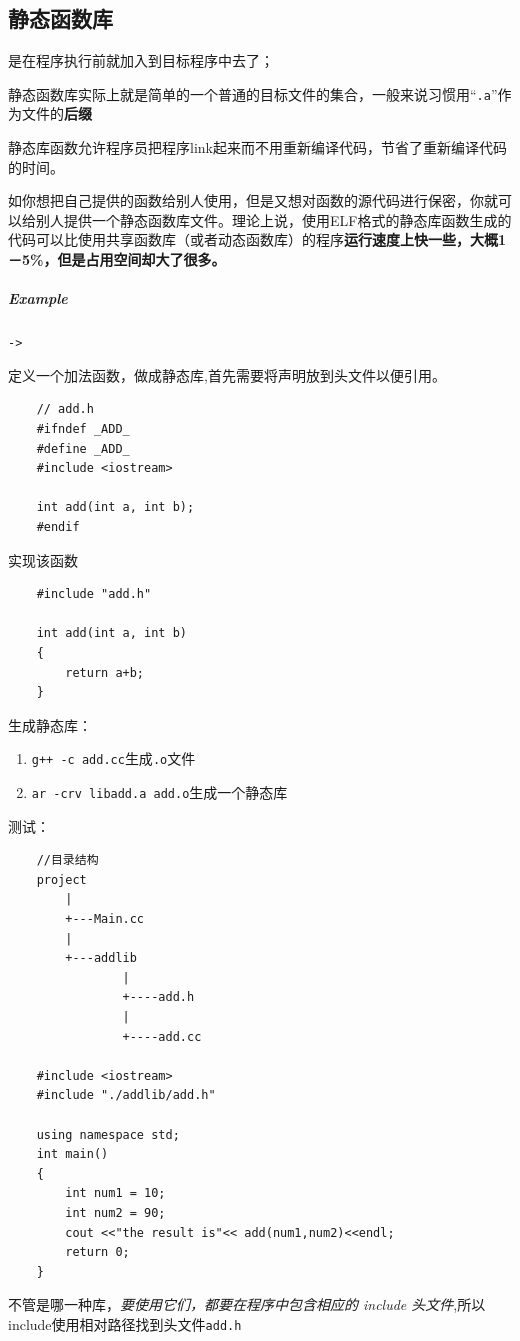 \documentclass[UTF8,a4paper,12pt]{ctexbook}
\begin{document}
		\subsection{静态函数库}是在程序执行前就加入到目标程序中去了；
		
			静态函数库实际上就是简单的一个普通的目标文件的集合，一般来说习惯用“\verb|.a|”作为文件的\textbf{后缀}
			
			静态库函数允许程序员把程序link起来而不用重新编译代码，节省了重新编译代码的时间。
			
			如你想把自己提供的函数给别人使用，但是又想对函数的源代码进行保密，你就可以给别人提供一个静态函数库文件。理论上说，使用ELF格式的静态库函数生成的代码可以比使用共享函数库（或者动态函数库）的程序\textbf{运行速度上快一些，大概1－5\%，但是占用空间却大了很多。}
			
			\subparagraph{Example}\verb|->|
				
				定义一个加法函数，做成静态库,首先需要将声明放到头文件以便引用。
				\begin{lstlisting}
	// add.h
	#ifndef _ADD_
	#define _ADD_
	#include <iostream>
	
	int add(int a, int b);
	#endif
				\end{lstlisting}
				
				实现该函数
				\begin{lstlisting}
	#include "add.h"
	
	int add(int a, int b)
	{
		return a+b;
	}
				\end{lstlisting}
			
				生成静态库：
				\begin{enumerate}[itemindent = 2em]
					\item \verb|g++ -c add.cc|生成\verb|.o|文件
					\item \verb|ar -crv libadd.a add.o|生成一个静态库
				\end{enumerate}
				
				
				测试：
				\begin{lstlisting}
	//目录结构
	project
		|
		+---Main.cc
		|
		+---addlib
				|
				+----add.h
				|
				+----add.cc
	
	#include <iostream>
	#include "./addlib/add.h"
	
	using namespace std;
	int main()
	{
		int num1 = 10;
		int num2 = 90;
		cout <<"the result is"<< add(num1,num2)<<endl;
		return 0;
	}
				\end{lstlisting}
				不管是哪一种库，\textit{要使用它们，都要在程序中包含相应的 include 头文件},所以include使用相对路径找到头文件\verb|add.h|
				
\end{document}
